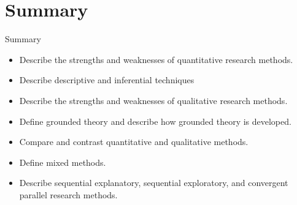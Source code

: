 \section{Summary}

\begin{center}
	\begin{tkawybox}{Summary}
		\begin{itemize}
			\setlength{\itemsep}{0pt}
			\setlength{\parskip}{0pt}
			\setlength{\parsep}{0pt}
			
			\item Describe the strengths and weaknesses of quantitative research methods.
			\item Describe descriptive and inferential techniques
			\item Describe the strengths and weaknesses of qualitative research methods.
			\item Define grounded theory and describe how grounded theory is developed.
			\item Compare and contrast quantitative and qualitative methods.
			\item Define mixed methods.
			\item Describe sequential explanatory, sequential exploratory, and convergent parallel research methods.
		\end{itemize}
	\end{tkawybox}
\end{center}
